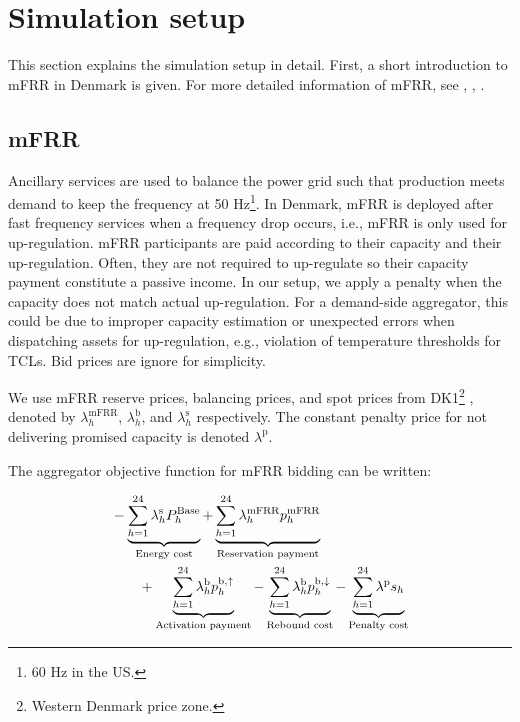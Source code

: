 \documentclass[lettersize,journal]{IEEEtran}
\begin{document}
\section{Simulation setup}

This section explains the simulation setup in detail. First, a short introduction to mFRR in Denmark is given. For more detailed information of mFRR, see \cite{energinet:Systemydelser}, \cite{energinet:prequalification}, \cite{energinet:tender_conditions_reserves}.

\subsection{mFRR}\label{sec:mFRR}

Ancillary services are used to balance the power grid such that production meets demand to keep the frequency at 50 Hz\footnote{60 Hz in the US.}. In Denmark, mFRR is deployed after fast frequency services when a frequency drop occurs, i.e., mFRR is only used for up-regulation. mFRR participants are paid according to their capacity and their up-regulation. Often, they are not required to up-regulate so their capacity payment constitute a passive income. In our setup, we apply a penalty when the capacity does not match actual up-regulation. For a demand-side aggregator, this could be due to improper capacity estimation or unexpected errors when dispatching assets for up-regulation, e.g., violation of temperature thresholds for TCLs. Bid prices are ignore for simplicity.

We use mFRR reserve prices, balancing prices, and spot prices from DK1\footnote{Western Denmark price zone.} \cite{energinet:energidataservice}, denoted by $\lambda_{h}^{\text{mFRR}}$, $\lambda_{h}^{\text{b}}$, and $\lambda_{h}^{\text{s}}$ respectively. The constant penalty price for not delivering promised capacity is denoted $\lambda^{\text{p}}$.

The aggregator objective function for mFRR bidding can be written:

\begin{align}\label{eq:mFRRObjective}
     & - \underbrace{\sum_{h=1}^{24} \lambda^{\text{s}}_{h}P^{\text{Base}}_{h}}_{\textrm{Energy cost}} + \underbrace{\sum_{h=1}^{24}\lambda_{h}^{\text{mFRR}} p^{\text{mFRR}}_{h}}_{\textrm{Reservation payment}}  \notag \\ & \quad \quad + \underbrace{\sum_{h=1}^{24}  \lambda_{h}^{\text{b}} p^{\text{b},\uparrow}_{h}}_{\textrm{Activation payment}} - \underbrace{\sum_{h=1}^{24}  \lambda_{h}^{\text{b}} p^{\text{b},\downarrow}_{h}}_{\textrm{Rebound cost}} - \underbrace{ \sum_{h=1}^{24}  \lambda^{\text{p}}s_{h}}_{\textrm{Penalty cost}}
\end{align}
\end{document}
